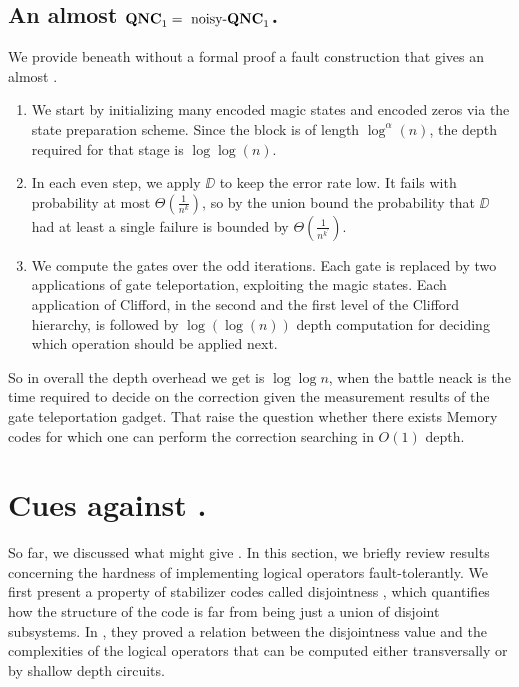 \documentclass[manuscript,screen,review]{acmart}
\begin{document}
{%
  \subsection{An almost $\mathbf{QNC}_{1}{} = \text{ noisy-}\mathbf{QNC}_{1}{} $.}
  We provide beneath without a formal proof a fault construction that gives an almost \CDO. 
  \begin{enumerate}
    \item We start by initializing many encoded magic states and encoded zeros via the state preparation scheme. Since the block is of length $\log^{\alpha}(n)$, the depth required for that stage is $\log\log(n)$.
    \item In each even step, we apply $\DD$ to keep the error rate low. It fails with probability at most $\Theta\left(\frac{1}{n^k}\right)$, so by the union bound the probability that $\DD$ had at least a single failure is bounded by $\Theta(\frac{1}{n^{k^{\prime}}})$.
    \item We compute the gates over the odd iterations. Each gate is replaced by two applications of gate teleportation, exploiting the magic states. Each application of Clifford, in the second and the first level of the Clifford hierarchy, is followed by $\log(\log (n))$ depth computation for deciding which operation should be applied next.
  \end{enumerate}
  So in overall the depth overhead we get is $\log \log n$, when the battle neack is the time required to decide on the correction  given the measurement results of the gate teleportation gadget. That raise the question whether there exists Memory codes for which one can perform the correction searching in $O(1)$ depth. 

  \newpage
  \section{ Cues against \CDO.  }\label{sec:passi}
So far, we discussed what might give \CDO. In this section, we briefly review results concerning the hardness of implementing logical operators fault-tolerantly. 
We first present a property of stabilizer codes called disjointness \cite{bostanci2021findingdisjointnessstabilizercodes}, which quantifies how the structure of the code is far from being just a union of disjoint subsystems. In \cite{bostanci2021findingdisjointnessstabilizercodes}, they proved a relation between the disjointness value and the complexities of the logical operators that can be computed either transversally or by shallow depth circuits.


}
\end{document}
